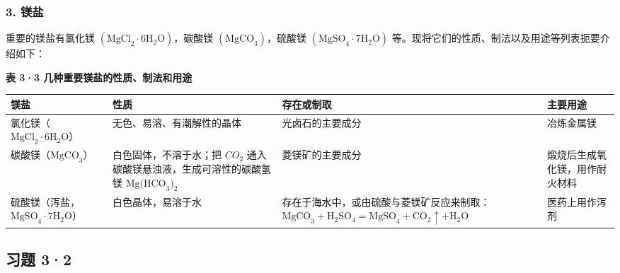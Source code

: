 \subsubsection{3. 镁盐}

重要的镁盐有氯化镁
\(\left(\mathrm{MgCl}_{2}\cdot6\mathrm{H}_{2}\mathrm{O}\right)\)，碳酸镁
\(\left(\mathrm{MgCO}_{3}\right)\)，硫酸镁
\(\left(\mathrm{MgSO}_{4}\cdot7\mathrm{H}_{2}\mathrm{O}\right)\)
等。现将它们的性质、制法以及用途等列表扼要介绍如下：

\textbf{表 3·3 几种重要镁盐的性质、制法和用途}

{\def\LTcaptype{none} %
\begin{longtable}[]{@{}
  >{\raggedright\arraybackslash}p{}
  >{\raggedright\arraybackslash}p{}
  >{\raggedright\arraybackslash}p{}
  >{\raggedright\arraybackslash}p{}@{}}
\toprule\noalign{}
\begin{minipage}[b]{\linewidth}\raggedright
镁盐
\end{minipage} & \begin{minipage}[b]{\linewidth}\raggedright
性质
\end{minipage} & \begin{minipage}[b]{\linewidth}\raggedright
存在或制取
\end{minipage} & \begin{minipage}[b]{\linewidth}\raggedright
主要用途
\end{minipage} \\
\midrule\noalign{}
\endhead
\bottomrule\noalign{}
\endlastfoot
氯化镁（\(\mathrm{MgCl}_{2}\cdot6\mathrm{H}_{2}\mathrm{O}\)） &
无色、易溶、有潮解性的晶体 & 光卤石的主要成分 & 冶炼金属镁 \\
碳酸镁（\(\mathrm{MgCO}_{3}\)） & 白色固体，不溶于水；把 \(CO_{2}\)
通入碳酸镁悬浊液，生成可溶性的碳酸氢镁 \(\mathrm{Mg(HCO}_{3})_{2}\) &
菱镁矿的主要成分 & 煅烧后生成氧化镁，用作耐火材料 \\
硫酸镁（泻盐，\(\mathrm{MgSO}_{4}\cdot7\mathrm{H}_{2}\mathrm{O}\)） &
白色晶体，易溶于水 &
存在于海水中，或由硫酸与菱镁矿反应来制取：\(\mathrm{MgCO}_{3}+\mathrm{H}_{2}\mathrm{SO}_{4}=\mathrm{MgSO}_{4}+\mathrm{CO}_{2}\uparrow+\mathrm{H}_{2}\mathrm{O}\)
& 医药上用作泻剂 \\
\end{longtable}
}

\subsection{习题 3·2}

